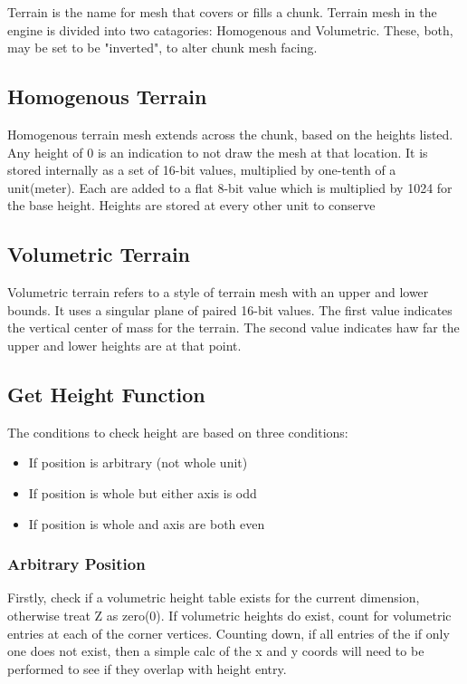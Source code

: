 Terrain is the name for mesh that covers or fills a chunk. Terrain mesh in the engine is divided into two catagories: Homogenous and Volumetric. These, both, may be set to be "inverted", to alter chunk mesh facing.

\subsection{Homogenous Terrain}

Homogenous terrain mesh extends across the chunk, based on the heights listed. Any height of 0 is an indication to not draw the mesh at that location. It is stored internally as a set of 16-bit values, multiplied by one-tenth of a unit(meter). Each are added to a flat 8-bit value which is multiplied by 1024 for the base height. Heights are stored at every other unit to conserve 

\subsection{Volumetric Terrain}

Volumetric terrain refers to a style of terrain mesh with an upper and lower bounds. It uses a singular plane of paired 16-bit values. The first value indicates the vertical center of mass for the terrain. The second value indicates haw far the upper and lower heights are at that point. 

\subsection{Get Height Function}

The conditions to check height are based on three conditions:
\begin{itemize}
    \item If position is arbitrary (not whole unit)
    \item If position is whole but either axis is odd
    \item If position is whole and axis are both even
\end{itemize}

\subsubsection{Arbitrary Position}
    Firstly, check if a volumetric height table exists for the current dimension, otherwise treat Z as zero(0). If volumetric heights do exist, count for volumetric entries at each of the corner vertices. Counting down, if all entries of the  if only one does not exist, then a simple calc of the x and y coords will need to be performed to see if they overlap with height entry.

